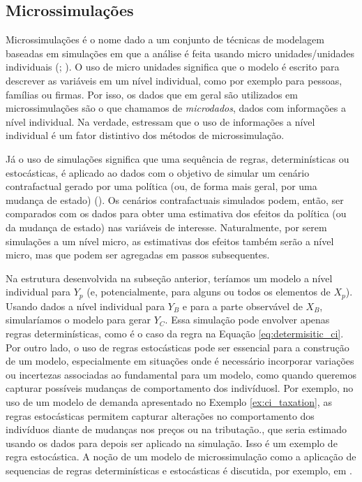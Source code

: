 \documentclass[12pt]{article}
\theoremstyle{break}
\begin{document}
\subsection{Microssimulações}
\label{sec:microssimulacao_intro}
Microssimulações é o nome dado a um conjunto de técnicas de modelagem baseadas em simulações em que a análise é feita usando micro unidades/unidades individuais (\cite[capítulo~1]{odonoghue2021}; \cite{figari2015}). O uso de micro unidades significa que o modelo é escrito para descrever as variáveis em um nível individual, como por exemplo para pessoas, famílias ou firmas. Por isso, os dados que em geral são utilizados em microssimulações são o que chamamos de \textit{microdados}, dados com informações a nível individual. Na verdade, \textcite[capítulo~1]{mitton2000microsimulation} estressam que o uso de informações a nível individual é um fator distintivo dos métodos de microssimulação. 

Já o uso de simulações significa que uma sequência de regras, determinísticas ou estocásticas, é aplicado ao dados com o objetivo de simular um cenário contrafactual gerado por uma política (ou, de forma mais geral, por uma mudança de estado) (\cite{figari2015}). Os cenários contrafactuais simulados podem, então, ser comparados com os dados para obter uma estimativa dos efeitos da política (ou da mudança de estado) nas variáveis de interesse. Naturalmente, por serem simulações a um nível micro, as estimativas dos efeitos também serão a nível micro, mas que podem ser agregadas em passos subsequentes.

Na estrutura desenvolvida na subseção anterior, teríamos um modelo a nível individual para $Y_p$ (e, potencialmente, para alguns ou todos os elementos de $X_p$). Usando dados a nível individual para $Y_B$ e para a parte observável de $X_B$, simularíamos o modelo para gerar $Y_C$. Essa simulação pode envolver apenas regras determinísticas, como é o caso da regra na Equação \eqref{eq:determisitic_ci}. Por outro lado, o uso de regras estocásticas pode ser essencial para a construção de um modelo, especialmente em situações onde é necessário incorporar variações ou incertezas associadas ao fundamental para um modelo, como quando queremos capturar possíveis mudanças de comportamento dos indivíduosl. Por exemplo, no uso de um modelo de demanda apresentado no Exemplo \ref{ex:ci_taxation}, as regras estocásticas permitem capturar alterações no comportamento dos indivíduos diante de mudanças nos preços ou na tributação., que seria estimado usando os dados para depois ser aplicado na simulação. Isso é um exemplo de regra estocástica. A noção de um modelo de microssimulação como a aplicação de sequencias de regras determinísticas e estocásticas é discutida, por exemplo, em \textcite[capítulo~2]{odonoghue2021}.
\end{document}
